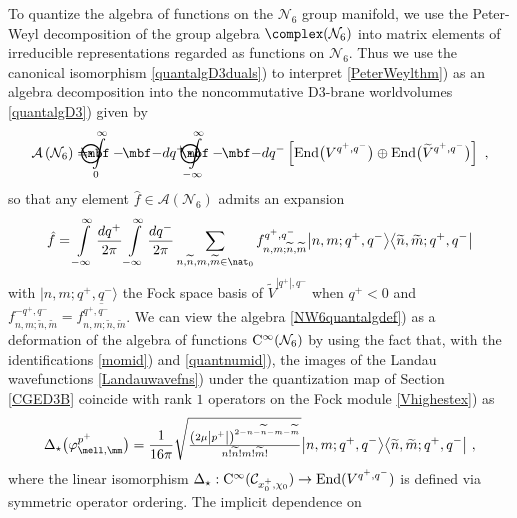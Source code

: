 To quantize the algebra of functions on the $\mathcal{N}_6$ group
manifold, we use the Peter-Weyl decomposition of the group algebra
$\complex(\mathcal{N}_6)$ into matrix elements of irreducible
representations regarded as functions on $\mathcal{N}_6$. Thus we use
the canonical isomorphism \eqref{quantalgD3duals}) to
interpret \eqref{PeterWeylthm}) as an algebra decomposition into
the noncommutative D3-brane worldvolumes \eqref{quantalgD3}) given by
\begin{equation}
\mathcal{A}\left(\mathcal{N}_6\right)= {\int\limits_0^\infty
\!\!\!\!\!\!\!\!\!\!\!\!  \bigodot\!\!\!\!\!\!\!\!\!\!\mbf-\!\!
\mbf-}  d q^+  {\int\limits_{-\infty}^\infty
\!\!\!\!\!\!\!\!\!\!\!\! \bigodot\!\!\!\!\!\!\!\!\!\!\mbf-\!\!
\mbf-}  d q^- \left[{\rm End}\bigl(V^{q^+,q^-}\bigr)\oplus
{\rm End}\bigl(\widetilde{V}^{q^+,q^-}\bigr)\right] \ ,
\label{NW6quantalgdef}\end{equation}
so that any element $\hat f\in\mathcal{A}(\mathcal{N}_6)$ admits an
expansion
\begin{equation}
\hat f=\int\limits_{-\infty}^\infty
\frac{ d q^+}{2\pi} \int\limits_{-\infty}^\infty\frac{ d q^-}
{2\pi} \sum_{n,\widetilde{n},m,\widetilde{m}\in\nat_0}
f_{n,m;\widetilde{n},\widetilde{m}}^{q^+,q^-} 
\bigl|n,m;q^+,q^-\bigr\rangle\bigl\langle
\widetilde{n},\widetilde{m} ;q^+,q^-\bigr|
\label{hatfNW6exp}\end{equation}
with $|n,m;q^+,q^-\rangle$ the Fock space basis of
$\widetilde{V}^{|q^+|,q^-}$ when $q^+<0$ and
$f_{n,m;\widetilde{n},\widetilde{m}}^{-q^+,q^-}=
\overline{f_{n,m;\widetilde{n},\widetilde{m}}^{q^+,q^-}}$.
We can view the algebra
\eqref{NW6quantalgdef}) as a deformation of the algebra of functions
${\rm C}^\infty(\mathcal{N}_6)$ by using the fact that, with the
identifications \eqref{momid}) and \eqref{quantnumid}),
the images of the Landau wavefunctions \eqref{Landauwavefns}) under the
quantization map of Section \ref{CGED3B} coincide with rank $1$
operators on the Fock module \eqref{Vhighestex}) as \cite{LSZ1}
\begin{equation}
\Delta_\star\bigl(\varphi^{p^+}_{\mell,\mm}\bigr)=
\frac1{16\pi} \sqrt{\mbox{$\frac{\left(2\mu \left|p^+\right|
\right)^{2-n-\widetilde{n}-m-\widetilde{m}}}{n! \widetilde{n}! m! 
\widetilde{m}!}$}} \bigl|n,m;q^+,q^-\bigr\rangle\bigl\langle
\widetilde{n},\widetilde{m} ;q^+,q^-\bigr| \ ,
\label{LandauWigner}\end{equation}
where the linear isomorphism $\Delta_\star:{\rm
  C}^\infty(\mathcal{C}_{x_0^+,\chi_0})\to{\rm End}(V^{q^+,q^-})$
is defined via symmetric operator ordering. The implicit dependence on
